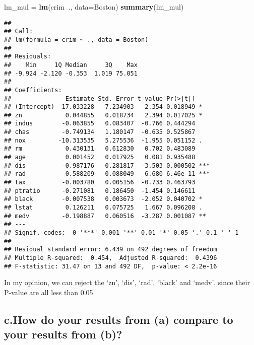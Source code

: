 \documentclass[]{article}
\newenvironment{Shaded}{\begin{snugshade}}{\end{snugshade}}
\newcommand{\DataTypeTok}[1]{\textcolor[rgb]{0.13,0.29,0.53}{#1}}
\newcommand{\KeywordTok}[1]{\textcolor[rgb]{0.13,0.29,0.53}{\textbf{#1}}}
\newcommand{\NormalTok}[1]{#1}
\newcommand{\OperatorTok}[1]{\textcolor[rgb]{0.81,0.36,0.00}{\textbf{#1}}}
\newcommand{\StringTok}[1]{\textcolor[rgb]{0.31,0.60,0.02}{#1}}
\begin{document}
\begin{Shaded}
\begin{Highlighting}[]
\NormalTok{lm_mul =}\StringTok{ }\KeywordTok{lm}\NormalTok{(crim}\OperatorTok{~}\NormalTok{., }\DataTypeTok{data=}\NormalTok{Boston)}
\KeywordTok{summary}\NormalTok{(lm_mul)}
\end{Highlighting}
\end{Shaded}

\begin{verbatim}
## 
## Call:
## lm(formula = crim ~ ., data = Boston)
## 
## Residuals:
##    Min     1Q Median     3Q    Max 
## -9.924 -2.120 -0.353  1.019 75.051 
## 
## Coefficients:
##               Estimate Std. Error t value Pr(>|t|)    
## (Intercept)  17.033228   7.234903   2.354 0.018949 *  
## zn            0.044855   0.018734   2.394 0.017025 *  
## indus        -0.063855   0.083407  -0.766 0.444294    
## chas         -0.749134   1.180147  -0.635 0.525867    
## nox         -10.313535   5.275536  -1.955 0.051152 .  
## rm            0.430131   0.612830   0.702 0.483089    
## age           0.001452   0.017925   0.081 0.935488    
## dis          -0.987176   0.281817  -3.503 0.000502 ***
## rad           0.588209   0.088049   6.680 6.46e-11 ***
## tax          -0.003780   0.005156  -0.733 0.463793    
## ptratio      -0.271081   0.186450  -1.454 0.146611    
## black        -0.007538   0.003673  -2.052 0.040702 *  
## lstat         0.126211   0.075725   1.667 0.096208 .  
## medv         -0.198887   0.060516  -3.287 0.001087 ** 
## ---
## Signif. codes:  0 '***' 0.001 '**' 0.01 '*' 0.05 '.' 0.1 ' ' 1
## 
## Residual standard error: 6.439 on 492 degrees of freedom
## Multiple R-squared:  0.454,  Adjusted R-squared:  0.4396 
## F-statistic: 31.47 on 13 and 492 DF,  p-value: < 2.2e-16
\end{verbatim}

In my opinion, we can reject the `zn', `dis', `rad', `black' and `medv',
since their P-value are all less than 0.05.

\hypertarget{c.how-do-your-results-from-a-compare-to-your-results-from-b}{%
\subsection{c.How do your results from (a) compare to your results from
(b)?}\label{c.how-do-your-results-from-a-compare-to-your-results-from-b}}
\end{document}
